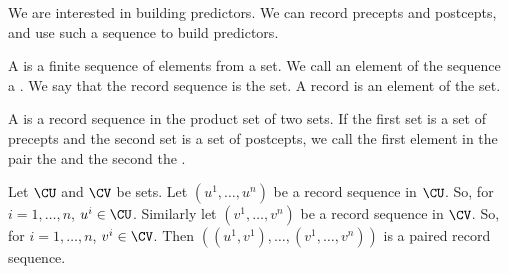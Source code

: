 

We are interested in building predictors.
We can record
precepts and postcepts, and use such a sequence
to build predictors.


A 
is a finite sequence of elements
from a set.
We call an element of the sequence
a .
We say that the record sequence
is  the set. A record
is an element of the set.

A 
is a record sequence in the
product set of two sets. If the first set
is a set of precepts and the second set is
a set of postcepts,
we call the first element
in the pair the 
and the second the .


Let $\CU$ and $\CV$ be sets.
Let $(u^1, \dots, u^n)$ be a record sequence in $\CU$.
So, for $i = 1, \dots, n$, $u^i \in \CU$.
Similarly let $(v^1, \dots, v^n)$ be a record sequence in $\CV$.
So, for $i = 1, \dots, n$, $v^i \in \CV$.
Then $((u^1, v^1), \dots, (v^1, \dots, v^n))$
is a paired record sequence.
